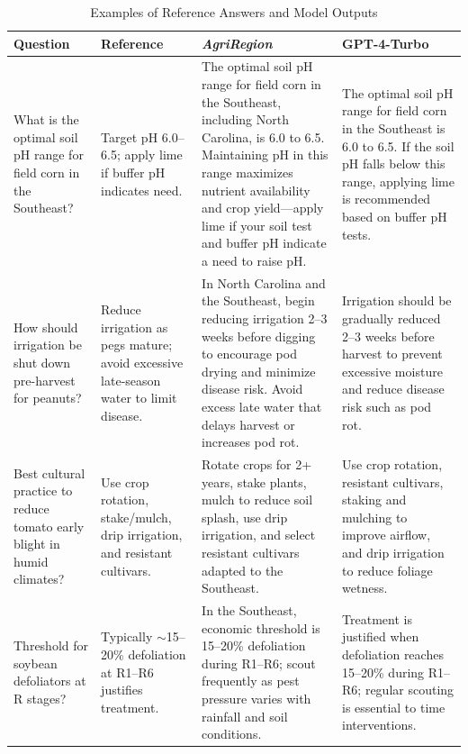 \documentclass{ieeeaccess}
\newcommand{\AgriRegion}{\textit{AgriRegion}}
\begin{document}
\begin{table}[t]
\centering
\caption{Examples of Reference Answers and Model Outputs}
\label{tab:soilfertility-small}
\renewcommand{\arraystretch}{1.25}
\begin{tabular}{p{2.2cm} p{2.2cm} p{4.5cm} p{4.5cm}}
\toprule
\textbf{Question} & \textbf{Reference} & \textbf{\AgriRegion} & \textbf{GPT-4-Turbo} \\
\midrule

What is the optimal soil pH range for field corn in the Southeast? 
& Target pH 6.0--6.5; apply lime if buffer pH indicates need.
& The optimal soil pH range for field corn in the Southeast, including North Carolina, is 6.0 to 6.5. Maintaining pH in this range maximizes nutrient availability and crop yield—apply lime if your soil test and buffer pH indicate a need to raise pH. 
& The optimal soil pH range for field corn in the Southeast is 6.0 to 6.5. If the soil pH falls below this range, applying lime is recommended based on buffer pH tests. \\

\midrule

How should irrigation be shut down pre-harvest for peanuts?
& Reduce irrigation as pegs mature; avoid excessive late-season water to limit disease.
& In North Carolina and the Southeast, begin reducing irrigation 2--3 weeks before digging to encourage pod drying and minimize disease risk. Avoid excess late water that delays harvest or increases pod rot. 
& Irrigation should be gradually reduced 2--3 weeks before harvest to prevent excessive moisture and reduce disease risk such as pod rot. \\

\midrule

Best cultural practice to reduce tomato early blight in humid climates?
& Use crop rotation, stake/mulch, drip irrigation, and resistant cultivars.
& Rotate crops for 2+ years, stake plants, mulch to reduce soil splash, use drip irrigation, and select resistant cultivars adapted to the Southeast. 
& Use crop rotation, resistant cultivars, staking and mulching to improve airflow, and drip irrigation to reduce foliage wetness. \\

\midrule

Threshold for soybean defoliators at R stages?
& Typically $\sim$15--20\% defoliation at R1--R6 justifies treatment.
& In the Southeast, economic threshold is 15--20\% defoliation during R1--R6; scout frequently as pest pressure varies with rainfall and soil conditions. 
& Treatment is justified when defoliation reaches 15--20\% during R1--R6; regular scouting is essential to time interventions. \\


\end{tabular}
\end{table}
\end{document}
